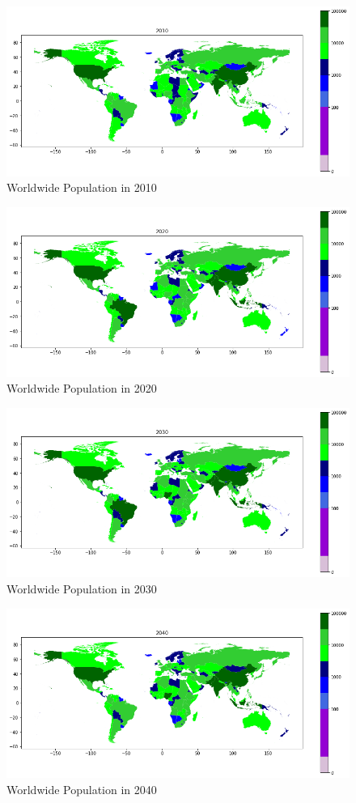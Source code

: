 \documentclass[a4paper, 11pt]{article}
\begin{document}
\begin{figure}[h!]
    \centering
    \includegraphics[width=0.9 \textwidth]{Images_Q2/2010.png}
    \caption{Worldwide Population in 2010}
    \label{fig:figure12}
\end{figure}
\newpage
\begin{figure}[h!]
    \centering
    \includegraphics[width=0.9 \textwidth]{Images_Q2/2020.png}
    \caption{Worldwide Population in 2020}
    \label{fig:figure13}
\end{figure}
\begin{figure}[h!]
    \centering
    \includegraphics[width=0.9 \textwidth]{Images_Q2/2030.png}
    \caption{Worldwide Population in 2030}
    \label{fig:figure14}
\end{figure}
\newpage
\begin{figure}[h!]
    \centering
    \includegraphics[width=0.9 \textwidth]{Images_Q2/2040.png}
    \caption{Worldwide Population in 2040}
    \label{fig:figure15}
\end{figure}
\end{document}
